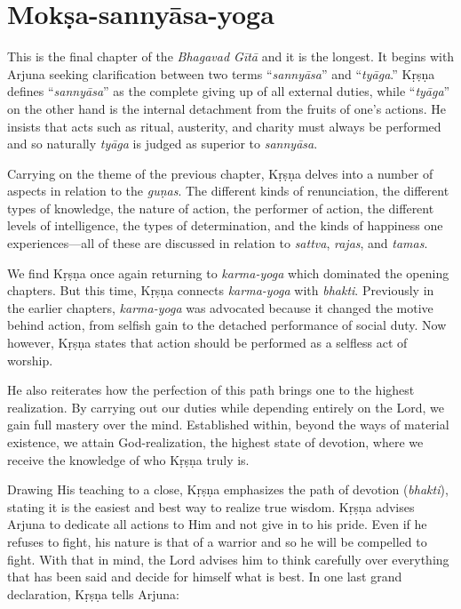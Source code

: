 \chapter{Mokṣa-sannyāsa-yoga}\label{chap-moksa-sannyasa-yoga}

This is the final chapter of the \textit{Bhagavad Gītā} and it is the longest. It begins with Arjuna seeking clarification between two terms \enquote{\textit{sannyāsa}} and \enquote{\textit{tyāga}.} Kṛṣṇa defines \enquote{\textit{sannyāsa}} as the complete giving up of all external duties, while \enquote{\textit{tyāga}} on the other hand is the internal detachment from the fruits of one’s actions. He insists that acts such as ritual, austerity, and charity must always be performed and so naturally \textit{tyāga} is judged as superior to \textit{sannyāsa}.

Carrying on the theme of the previous chapter, Kṛṣṇa delves into a number of aspects in relation to the \textit{guṇas}. The different kinds of renunciation, the different types of knowledge, the nature of action, the performer of action, the different levels of intelligence, the types of determination, and the kinds of happiness one experiences---all of these are discussed in relation to \textit{sattva}, \textit{rajas}, and \textit{tamas}.

We find Kṛṣṇa once again returning to \textit{karma-yoga} which dominated the opening chapters. But this time, Kṛṣṇa connects \textit{karma-yoga} with \textit{bhakti}. Previously in the earlier chapters, \textit{karma-yoga} was advocated because it changed the motive behind action, from selfish gain to the detached performance of social duty. Now however, Kṛṣṇa states that action should be performed as a selfless act of worship.

He also reiterates how the perfection of this path brings one to the highest realization. By carrying out our duties while depending entirely on the Lord, we gain full mastery over the mind. Established within, beyond the ways of material existence, we attain God-realization, the highest state of devotion, where we receive the knowledge of who Kṛṣṇa truly is.

Drawing His teaching to a close, Kṛṣṇa emphasizes the path of devotion (\textit{bhakti}), stating it is the easiest and best way to realize true wisdom. Kṛṣṇa advises Arjuna to dedicate all actions to Him and not give in to his pride. Even if he refuses to fight, his nature is that of a warrior and so he will be compelled to fight. With that in mind, the Lord advises him to think carefully over everything that has been said and decide for himself what is best. In one last grand declaration, Kṛṣṇa tells Arjuna:

